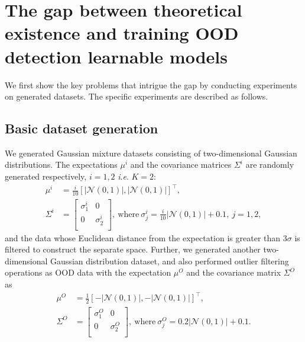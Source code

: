 \documentclass{article}
\theoremstyle{plain}
\theoremstyle{definition}
\theoremstyle{remark}
\begin{document}
\section{The gap between theoretical existence and training OOD detection learnable models}
\label{appendix C}
We first show the key problems that intrigue the gap by conducting experiments on generated datasets.
%
The specific experiments are described as follows. 

\subsection{Basic dataset generation} 
We generated Gaussian mixture datasets consisting of two-dimensional Gaussian distributions. 
%
The expectations $\mu^i$ and the covariance matrices $\Sigma^i$ are randomly generated respectively, $i=1,2$ \textit{i}.\textit{e}. $K=2$:
\begin{equation}
\begin{aligned}
    \mu^i &= \frac{i}{10}[|\mathcal{N}(0,1)|, |\mathcal{N}(0,1)|]^{\top},\\
    \Sigma^i &= \begin{bmatrix}
                \sigma_1^i &0\\
                0 &\sigma_2^i\\
            \end{bmatrix},~\text{where}~ \sigma_j^i=\frac{i}{10}|\mathcal{N}(0,1)| + 0.1,~j=1,2,
\end{aligned}
\end{equation}
and the data whose Euclidean distance from the expectation is greater than $3\sigma$ is filtered to construct the separate space. Further, we generated another two-dimensional Gaussian distribution dataset, and also performed outlier filtering operations as OOD data with the expectation $\mu^O$ and the covariance matrix $\Sigma^O$ as 
\begin{equation}
\begin{aligned}
    \mu^O &= \frac{1}{2}[-|\mathcal{N}(0,1)|, -|\mathcal{N}(0,1)|]^{\top},\\
    \Sigma^O &= \begin{bmatrix}
                \sigma_1^O &0\\
                0 &\sigma_2^O\\
            \end{bmatrix},~\text{where}~ \sigma_j^O=0.2|\mathcal{N}(0,1)| + 0.1.
\end{aligned}
\end{equation}
\end{document}
